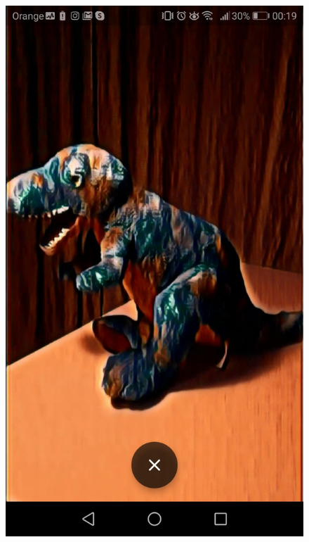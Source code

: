 \documentclass[../Main.tex]{subfiles}
\begin{document}
\begin{figure}[H]
        \includegraphics[width=\linewidth]{Images/app_photos/dino/twin.jpg}
    \endminipage\hfill

\end{figure}
\end{document}
